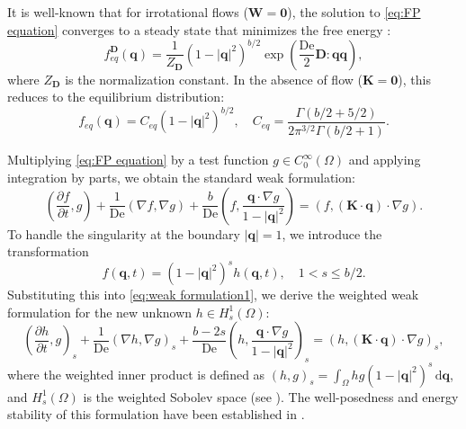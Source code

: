 \documentclass[preprint,12pt]{elsarticle}
\begin{document}
It is well-known that for irrotational flows ($\bm{W}=\bm{0}$), the solution to \eqref{eq:FP equation} converges to a steady state that minimizes the free energy \cite{Warner72}:
\begin{equation}
    f_{eq}^{\bm{D}}(\bm{q})=\frac{1}{Z_{\bm{D}}}(1-|\bm{q}|^2)^{b/2}
    \exp\left(\frac{\mathrm{De}}{2}\bm{D}:\bm{q}\bm{q}\right),\label{eq:f_eq^D}
\end{equation}
where $Z_{\bm{D}}$ is the normalization constant. In the absence of flow ($\bm{K}=\bm{0}$), this reduces to the equilibrium distribution:
\begin{equation}
    f_{eq}(\bm{q})=C_{eq}(1-|\bm{q}|^2)^{b/2},\quad C_{eq}=\frac{\Gamma(b/2+5/2)}{2\pi^{3/2}\Gamma(b/2+1)}.\label{eq:f_eq}
\end{equation}

Multiplying \eqref{eq:FP equation} by a test function $g \in C_0^{\infty}(\Omega)$ and applying integration by parts, we obtain the standard weak formulation:
\begin{equation}
    \left(\frac{\partial f}{\partial t},g\right)+\frac{1}{\mathrm{De}}\left(\nabla f,\nabla g\right)+\frac{b}{\mathrm{De}}\left(f,\frac{\bm{q}\cdot \nabla g}{1-|\bm{q}|^2}\right)=(f,(\bm{K}\cdot\bm{q})\cdot \nabla g).\label{eq:weak formulation1}
\end{equation}
To handle the singularity at the boundary $|\bm{q}|=1$, we introduce the transformation
\begin{equation*}
f(\bm{q},t)=(1-|\bm{q}|^2)^s h(\bm{q},t),\quad 1<s\leq b/2.
\end{equation*}
Substituting this into \eqref{eq:weak formulation1}, we derive the weighted weak formulation for the new unknown $h\in H^1_s(\Omega)$:
\begin{equation}
    \left(\frac{\partial h}{\partial t},g\right)_s+\frac{1}{\mathrm{De}}\left(\nabla h,\nabla g\right)_s+\frac{b-2s}{\mathrm{De}}\left(h,\frac{\bm{q}\cdot \nabla g}{1-|\bm{q}|^2}\right)_s=(h,(\boldsymbol{K}\cdot\bm{q})\cdot \nabla g)_s,\label{eq:weak formulation2}
\end{equation}
where the weighted inner product is defined as $(h,g)_s=\int_{\Omega}hg(1-|\bm{q}|^2)^s\,\mathrm{d}\bm{q}$, and $H_s^1(\Omega)$ is the weighted Sobolev space (see \cite{Kufner85}). The well-posedness and energy stability of this formulation have been established in \cite{Shen12}.
\end{document}

